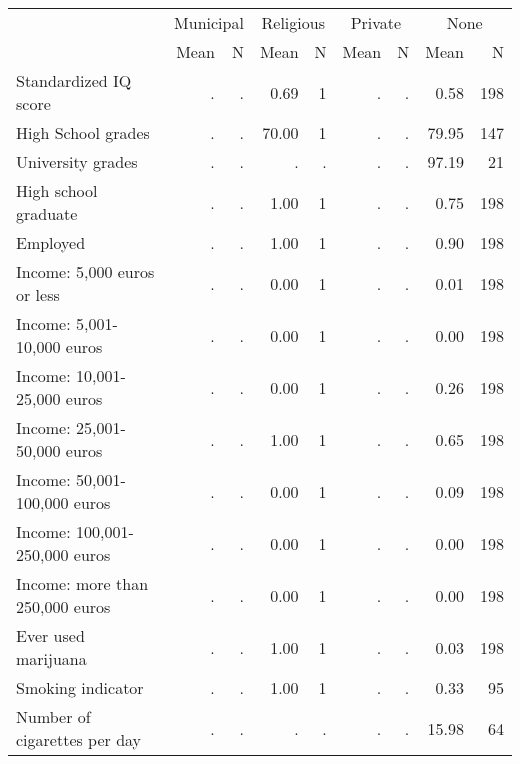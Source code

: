 \begin{tabular}{l r r r r r r r r}
\toprule
& \multicolumn{2}{c}{Municipal} & \multicolumn{2}{c}{Religious} & \multicolumn{2}{c}{Private} & \multicolumn{2}{c}{None} \\
& \scriptsize Mean & \scriptsize N & \scriptsize Mean & \scriptsize N & \scriptsize Mean & \scriptsize N & \scriptsize Mean & \scriptsize N \\
\midrule
Standardized IQ score &         . & . &      0.69 &         1 &         . & . &      0.58 &       198 \\
High School grades &         . & . &     70.00 &         1 &         . & . &     79.95 &       147 \\
University grades &         . & . &         . & . &         . & . &     97.19 &        21 \\
High school graduate &         . & . &      1.00 &         1 &         . & . &      0.75 &       198 \\
Employed &         . & . &      1.00 &         1 &         . & . &      0.90 &       198 \\
Income: 5,000 euros or less &         . & . &      0.00 &         1 &         . & . &      0.01 &       198 \\
Income: 5,001-10,000 euros &         . & . &      0.00 &         1 &         . & . &      0.00 &       198 \\
Income: 10,001-25,000 euros &         . & . &      0.00 &         1 &         . & . &      0.26 &       198 \\
Income: 25,001-50,000 euros &         . & . &      1.00 &         1 &         . & . &      0.65 &       198 \\
Income: 50,001-100,000 euros &         . & . &      0.00 &         1 &         . & . &      0.09 &       198 \\
Income: 100,001-250,000 euros &         . & . &      0.00 &         1 &         . & . &      0.00 &       198 \\
Income: more than 250,000 euros &         . & . &      0.00 &         1 &         . & . &      0.00 &       198 \\
Ever used marijuana &         . & . &      1.00 &         1 &         . & . &      0.03 &       198 \\
Smoking indicator &         . & . &      1.00 &         1 &         . & . &      0.33 &        95 \\
Number of cigarettes per day &         . & . &         . & . &         . & . &     15.98 &        64 \\

\end{tabular}
